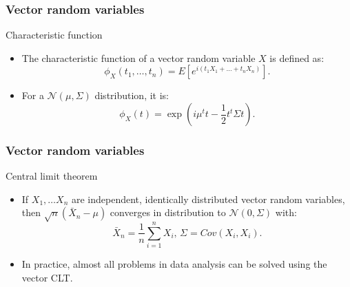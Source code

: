 \begin{frame}
    \frametitle{Vector random variables}
\begin{block}{Characteristic function}
    \begin{itemize}
        \item<+-> The characteristic function of a vector random variable $X$ is defined as:
        \begin{equation}
            \phi_X(t_1,\dots,t_n) = E\left[ e^{i \left( t_1X_1 + \dots + t_n X_n \right)} \right].
        \end{equation}
        \item<+-> For a $\mathcal{N}\left( \mu, \Sigma \right)$ distribution, it is:
        \begin{equation}
            \phi_X(t)= \exp \left( i \mu^t t- \frac{1}{2} t^t \Sigma t\right).
        \end{equation}
        \end{itemize}
\end{block}
\end{frame}
\begin{frame}
    \frametitle{Vector random variables}
\begin{block}{Central limit theorem}
    \begin{itemize}
        \item<+-> If $X_1, \dots X_n$ are independent, identically distributed 
        vector random variables, then $\sqrt{n} \left( \bar{X}_n - \mu \right)$
        converges in distribution to $\mathcal{N}\left( 0,  \Sigma \right)$ with:
        \begin{equation}
            \bar{X}_n = \frac{1}{n} \sum_{i=1}^n X_i, \, \Sigma = Cov(X_i, X_i).
        \end{equation}
        \item<+-> In practice, almost all problems in data analysis can be solved 
        using the vector CLT.
        \end{itemize}
\end{block}
\end{frame}
